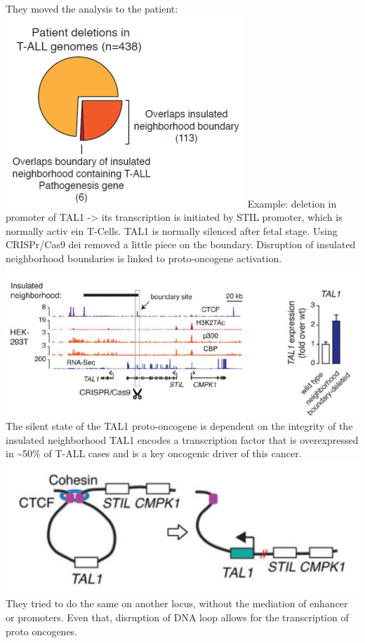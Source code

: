 They moved the analysis to the patient:
\includegraphics{../_resources/136f0b94b4833b6365281beb09fdd985.png}
Example: deletion in promoter of TAL1 -\textgreater{} its transcription is initiated by STIL promoter, which is normally activ ein T-Cells. TAL1 is normally silenced after fetal stage.
Using CRISPr/Cas9 dei removed a little piece on the boundary. Disruption of insulated neighborhood boundaries is linked to proto-oncogene activation.
\includegraphics{../_resources/bf32b9679af0fb7fcba57b9f87bb4207.png}
The silent state of the TAL1 proto-oncogene is dependent on the integrity of the insulated neighborhood TAL1 encodes a transcription factor that is overexpressed in \textasciitilde50\% of T-ALL cases and is a key oncogenic driver of this cancer.
\includegraphics{../_resources/3d83d920d425aa5f76bdbb127596c02b.png}
They tried to do the same on another locus, without the mediation of enhancer or promoters. Even that, disruption of DNA loop allows for the transcription of proto oncogenes.

